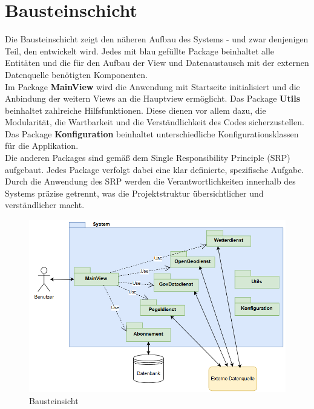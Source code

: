 \documentclass[a4paper,12pt]{scrreprt}
\begin{document}
\section*{\large \textbf{Bausteinschicht}}
Die Bausteinschicht zeigt den näheren Aufbau des Systems - und zwar denjenigen Teil, den entwickelt wird. Jedes mit blau gefüllte Package beinhaltet alle Entitäten und die für den Aufbau der View und Datenaustausch mit der externen Datenquelle benötigten Komponenten.\\
Im Package \textbf{MainView} wird die Anwendung mit Startseite initialisiert und die Anbindung der weitern Views an die Hauptview ermöglicht. Das Package \textbf{Utils} beinhaltet zahlreiche Hilfsfunktionen. Diese dienen vor allem dazu, die Modularität, die Wartbarkeit und die Verständlichkeit des Codes sicherzustellen. Das Package \textbf{Konfiguration} beinhaltet unterschiedliche Konfigurationsklassen für die Applikation.\\ Die anderen Packages sind gemäß dem Single Responsibility Principle (SRP) aufgebaut. Jedes Package verfolgt dabei eine klar definierte, spezifische Aufgabe. Durch die Anwendung des SRP werden die Verantwortlichkeiten innerhalb des Systems präzise getrennt, was die Projektstruktur übersichtlicher und verständlicher macht.
\begin{figure}[H]
	\centering
	\includegraphics[width=15cm]{Bausteinsicht-1.png}
	\caption{\label{} Bausteinsicht}
\end{figure}
\clearpage
\end{document}
